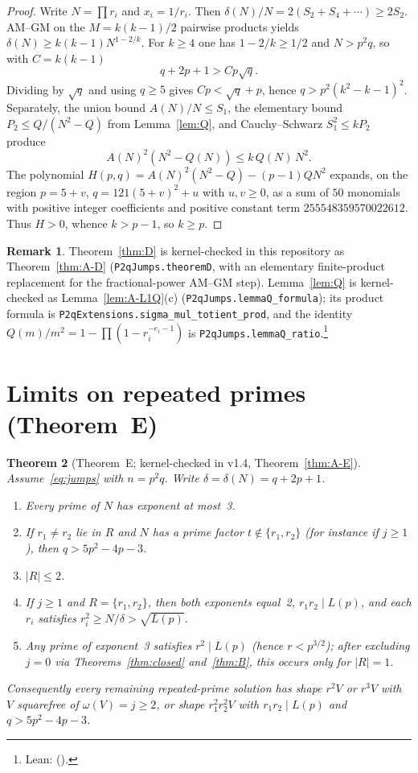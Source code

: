 \documentclass[11pt,reqno]{amsart}
\newcommand{\lean}[2]{\footnote{Lean: \path{#1} (\path{#2}).}}
\newtheorem{theorem}{Theorem}
\theoremstyle{definition}
\newtheorem{remark}[theorem]{Remark}
\begin{document}
\begin{proof}
Write \(N=\prod r_i\) and \(x_i=1/r_i\). Then \(\delta(N)/N=2(S_2+S_4+\cdots)\ge 2S_2\). AM--GM on the \(M=k(k-1)/2\) pairwise products yields \(\delta(N)\ge k(k-1)N^{1-2/k}\). For \(k\ge 4\) one has \(1-2/k\ge 1/2\) and \(N>p^2q\), so with \(C=k(k-1)\)
\[
q+2p+1>Cp\sqrt{q}.
\]
Dividing by \(\sqrt{q}\) and using \(q\ge 5\) gives \(Cp<\sqrt{q}+p\), hence \(q>p^2(k^2-k-1)^2\). Separately, the union bound \(A(N)/N\le S_1\), the elementary bound \(P_2\le Q/(N^2-Q)\) from Lemma~\ref{lem:Q}, and Cauchy--Schwarz \(S_1^2\le kP_2\) produce
\[
A(N)^2(N^2-Q(N))\le k\,Q(N)\,N^2.
\]
The polynomial \(H(p,q)=A(N)^2(N^2-Q)-(p-1)QN^2\) expands, on the region \(p=5+v\), \(q=121(5+v)^2+u\) with \(u,v\ge 0\), as a sum of \(50\) monomials with positive integer coefficients and positive constant term \(255548359570022612\). Thus \(H>0\), whence \(k>p-1\), so \(k\ge p\).
\end{proof}

\begin{remark}
Theorem~\ref{thm:D} is kernel-checked in this repository as Theorem~\ref{thm:A-D} (\texttt{P2qJumps.theoremD}, with an elementary finite-product replacement for the fractional-power AM--GM step). Lemma~\ref{lem:Q} is kernel-checked as Lemma~\ref{lem:A-L1Q}(c) (\texttt{P2qJumps.lemmaQ\_formula}); its product formula is \texttt{P2qExtensions.sigma\_mul\_totient\_prod}, and the identity \(Q(m)/m^2=1-\prod(1-r_i^{-e_i-1})\) is \texttt{P2qJumps.lemmaQ\_ratio}.\lean{P2qJumps.lemmaQ_ratio}{TheoremsBE.lean:308}
\end{remark}

\section{Limits on repeated primes (Theorem~E)}
\label{sec:thmE}

\begin{theorem}[Theorem~E; kernel-checked in v1.4, Theorem~\ref{thm:A-E}]
\label{thm:E}
Assume~\eqref{eq:jumps} with \(n=p^2q\). Write \(\delta=\delta(N)=q+2p+1\).
\begin{enumerate}
\item Every prime of \(N\) has exponent at most~3.
\item If \(r_1\ne r_2\) lie in \(R\) and \(N\) has a prime factor \(t\notin\{r_1,r_2\}\) (for instance if \(j\ge 1\)), then \(q>5p^2-4p-3\).
\item \(|R|\le 2\).
\item If \(j\ge 1\) and \(R=\{r_1,r_2\}\), then both exponents equal~2, \(r_1r_2\mid L(p)\), and each \(r_i\) satisfies \(r_i^2\ge N/\delta>\sqrt{L(p)}\).
\item Any prime of exponent~3 satisfies \(r^2\mid L(p)\) (hence \(r<p^{3/2}\)); after excluding \(j=0\) via Theorems~\ref{thm:closed} and~\ref{thm:B}, this occurs only for \(|R|=1\).
\end{enumerate}
Consequently every remaining repeated-prime solution has shape \(r^2V\) or \(r^3V\) with \(V\) squarefree of \(\omega(V)=j\ge 2\), or shape \(r_1^2r_2^2V\) with \(r_1r_2\mid L(p)\) and \(q>5p^2-4p-3\).
\end{theorem}
\end{document}

